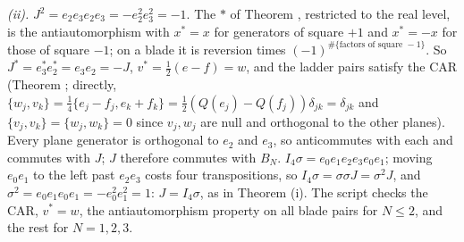 \emph{(ii).} $J^{2} = e_{2}e_{3}e_{2}e_{3} = -e_{2}^{2}e_{3}^{2} = -1$. The $*$ of Theorem , restricted to the real level, is the antiautomorphism with $x^{*} = x$ for generators of square $+1$ and $x^{*} = -x$ for those of square $-1$; on a blade it is reversion times $(-1)^{\#\{\text{factors of square } -1\}}$. So $J^{*} = e_{3}^{*}e_{2}^{*} = e_{3}e_{2} = -J$, $v^{*} = \tfrac12(e - f) = w$, and the ladder pairs satisfy the CAR (Theorem ; directly, $\{w_{j}, v_{k}\} = \tfrac14\{e_{j} - f_{j}, e_{k} + f_{k}\} = \tfrac12(Q(e_{j}) - Q(f_{j}))\delta_{jk} = \delta_{jk}$ and $\{v_{j}, v_{k}\} = \{w_{j}, w_{k}\} = 0$ since $v_{j}, w_{j}$ are null and orthogonal to the other planes). Every plane generator is orthogonal to $e_{2}$ and $e_{3}$, so anticommutes with each and commutes with $J$; $J$ therefore commutes with $B_{N}$. $I_{4}\sigma = e_{0}e_{1}e_{2}e_{3}e_{0}e_{1}$; moving $e_{0}e_{1}$ to the left past $e_{2}e_{3}$ costs four transpositions, so $I_{4}\sigma = \sigma\sigma J = \sigma^{2}J$, and $\sigma^{2} = e_{0}e_{1}e_{0}e_{1} = -e_{0}^{2}e_{1}^{2} = 1$: $J = I_{4}\sigma$, as in Theorem (i). The script checks the CAR, $v^{*} = w$, the antiautomorphism property on all blade pairs for $N \le 2$, and the rest for $N = 1, 2, 3$.

